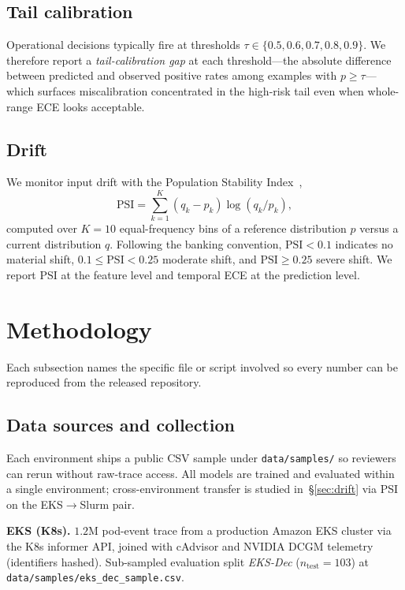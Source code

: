 \documentclass[conference]{IEEEtran}
\begin{document}
\subsection{Tail calibration}
Operational decisions typically fire at thresholds $\tau \in \{0.5, 0.6, 0.7, 0.8, 0.9\}$. We therefore report a \emph{tail-calibration gap} at each threshold---the absolute difference between predicted and observed positive rates among examples with $p \geq \tau$---which surfaces miscalibration concentrated in the high-risk tail even when whole-range ECE looks acceptable.

\subsection{Drift}
We monitor input drift with the Population Stability Index~\cite{siddiqi},
\begin{equation}
\mathrm{PSI} = \sum_{k=1}^{K} (q_k - p_k)\log(q_k / p_k),
\end{equation}
computed over $K=10$ equal-frequency bins of a reference distribution $p$ versus a current distribution $q$. Following the banking convention, $\mathrm{PSI} < 0.1$ indicates no material shift, $0.1 \leq \mathrm{PSI} < 0.25$ moderate shift, and $\mathrm{PSI} \geq 0.25$ severe shift. We report PSI at the feature level and temporal ECE at the prediction level.

\section{Methodology}
\label{sec:method}
Each subsection names the specific file or script involved so every number can be reproduced from the released repository.

\subsection{Data sources and collection}
Each environment ships a public CSV sample under \texttt{data/samples/} so reviewers can rerun without raw-trace access. All models are trained and evaluated within a single environment; cross-environment transfer is studied in~\S\ref{sec:drift} via PSI on the EKS$\to$Slurm pair.

\textbf{EKS (K8s).} $1.2$M pod-event trace from a production Amazon EKS cluster via the K8s informer API, joined with cAdvisor and NVIDIA DCGM telemetry (identifiers hashed). Sub-sampled evaluation split \textit{EKS-Dec} ($n_{\text{test}}{=}103$) at \texttt{data/samples/eks\_dec\_sample.csv}.
\end{document}
